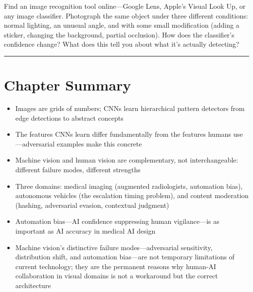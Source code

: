 \begin{trythis}
Find an image recognition tool online---Google Lens, Apple's Visual Look Up, or any image classifier. Photograph the same object under three different conditions: normal lighting, an unusual angle, and with some small modification (adding a sticker, changing the background, partial occlusion). How does the classifier's confidence change? What does this tell you about what it's actually detecting?
\end{trythis}

\bigskip
\begin{center}
\rule{0.5\textwidth}{0.4pt}
\end{center}
\bigskip

\section*{Chapter Summary}

\begin{keyconcept}
\begin{itemize}
    \item Images are grids of numbers; CNNs learn hierarchical pattern detectors from edge detections to abstract concepts
    \item The features CNNs learn differ fundamentally from the features humans use---adversarial examples make this concrete
    \item Machine vision and human vision are complementary, not interchangeable: different failure modes, different strengths
    \item Three \hitl domains: medical imaging (augmented radiologists, automation bias), autonomous vehicles (the escalation timing problem), and content moderation (hashing, adversarial evasion, contextual judgment)
    \item Automation bias---AI confidence suppressing human vigilance---is as important as AI accuracy in medical AI design
    \item Machine vision's distinctive failure modes---adversarial sensitivity, distribution shift, and automation bias---are not temporary limitations of current technology; they are the permanent reasons why human-AI collaboration in visual domains is not a workaround but the correct architecture
\end{itemize}
\end{keyconcept}


